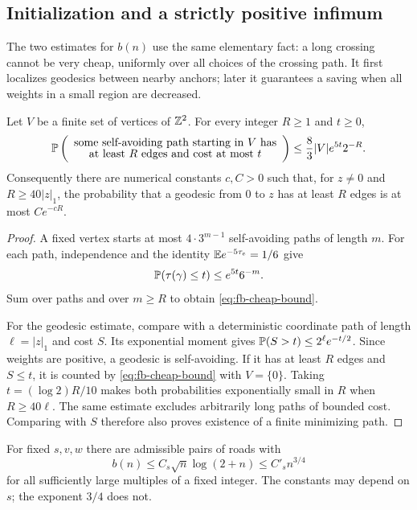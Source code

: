 \subsection{Initialization and a strictly positive infimum}
\label{sec:fb-bounds}

The two estimates for $b(n)$ use the same elementary fact: a long
crossing cannot be very cheap, uniformly over all choices of the
crossing path.  It first localizes geodesics between nearby anchors;
later it guarantees a saving when all weights in a small region are
decreased.

\begin{lemma}
\label{lem:fb-cheap-paths}
Let $V$ be a finite set of vertices of $\mathbb Z^2$.  For every integer
$R\ge1$ and $t\ge0$,
\begin{equation}
 \mathbb P \left(
 \begin{array}{c}
 \text{some self-avoiding path starting in $V$ has}\\[-2pt]
 \text{at least $R$ edges and cost at most $t$}
 \end{array}\right)
 \le \frac83 |V|e^{5t}2^{-R}.
 \label{eq:fb-cheap-bound}
\end{equation}
Consequently there are numerical constants $c,C>0$ such that, for
$z\ne0$ and $R\ge40|z|_1$, the probability that a geodesic from $0$ to
$z$ has at least $R$ edges is at most $Ce^{-cR}$.
\end{lemma}

\begin{proof}
A fixed vertex starts at most $4\cdot3^{m-1}$ self-avoiding paths
of length $m$.  For each path, independence and the identity
$\mathbb E e^{-5\tau_e}=1/6$ give
\[
 \mathbb P (\tau(\gamma)\le t)\le e^{5t}6^{-m}.
\]
Sum over paths and over $m\ge R$ to obtain
\eqref{eq:fb-cheap-bound}.

For the geodesic estimate, compare with a deterministic coordinate
path of length $\ell=|z|_1$ and cost $S$.  Its exponential moment gives
$\mathbb P (S>t)\le2^\ell e^{-t/2}$.  Since weights are positive, a
geodesic is self-avoiding.  If it has at least $R$ edges and $S\le t$,
it is counted by \eqref{eq:fb-cheap-bound} with $V=\{0\}$.  Taking
$t=(\log2)R/10$ makes both probabilities exponentially small in $R$
when $R\ge40\ell$.  The same estimate excludes arbitrarily long
paths of bounded cost.  Comparing with $S$ therefore also proves
existence of a finite minimizing path.
\end{proof}

\begin{proposition}
\label{prop:fb-upper}
For fixed $s,v,w$ there are admissible pairs of roads with
\begin{equation}
 b(n)\le C_s\sqrt n\log(2+n)\le C'_s n^{3/4}
 \label{eq:fb-upper}
\end{equation}
for all sufficiently large multiples of a fixed integer.  The constants
may depend on $s$; the exponent $3/4$ does not.
\end{proposition}

